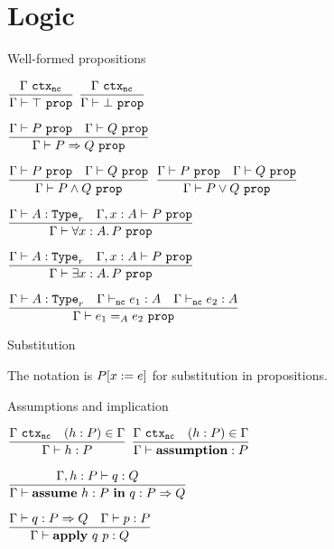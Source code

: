 \section{Logic}

\begin{frame}{Well-formed propositions}

\begin{center}
  $\infrule{\ctx[\noncomputable]{\Gamma}}{\prop[\Gamma]{\True}}$ \quad
  $\infrule{\ctx[\noncomputable]{\Gamma}}{\prop[\Gamma]{\False}}$

  \vspace{1em}

  $\infrule{\prop{P} \quad \prop{Q}}{\prop{\Impl{P}{Q}}}$

  \vspace{1em}

  $\infrule{\prop{P} \quad \prop{Q}}{\prop{\And{P}{Q}}}$ \quad
  $\infrule{\prop{P} \quad \prop{Q}}{\prop{\Or{P}{Q}}}$

  \vspace{1em}

  $\infrule{\type{A}[r] \quad \prop[\extend{\Gamma}{x}{A}]{P}}{\prop{\All{x}[A]{P}}}$

  \vspace{1em}

  $\infrule{\type{A}[r] \quad \prop[\extend{\Gamma}{x}{A}]{P}}{\prop{\Ex{x}[A]{P}}}$

  \vspace{1em}

  $\infrule{\type{A}[r] \quad \typing[\Gamma][\noncomputable]{e_1}{A} \quad \typing[\Gamma][\noncomputable]{e_2}{A}}{\prop[\Gamma]{\Eq[A]{e_1}{e_2}}}$

\end{center}

\end{frame}

\begin{frame}{Substitution}

The notation is $P[x := e]$ for substitution in propositions.

\end{frame}

\begin{frame}{Assumptions and implication}

\begin{center}

  $\infrule{\ctx[\noncomputable]{\Gamma} \quad \sidecond{(h : P) \in \Gamma}}{\proves[\Gamma]{h}{P}}$ \quad
  $\infrule{\ctx[\noncomputable]{\Gamma} \quad \sidecond{(h : P) \in \Gamma}}{\proves[\Gamma]{\assumption}{P}}$

  \vspace{2em}

  $\infrule{\proves[\assume{\Gamma}{h}{P}]{q}{Q}}{\proves[\Gamma]{\implintro{h}[P]{q}}{\Impl{P}{Q}}}$

  \vspace{2em}

  $\infrule{\proves{q}{\Impl{P}{Q}} \quad \proves{p}{P}}{\proves{\implelim{q}{p}}{Q}}$
\end{center}

\end{frame}

